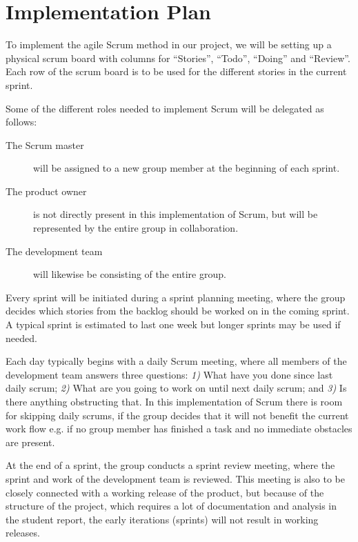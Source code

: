 \chapter{Implementation Plan} %
\label{cha:implementation_plan}
To implement the agile Scrum method in our project, we will be setting up a physical scrum board with columns for “Stories”, “Todo”, “Doing” and “Review”. Each row of the scrum board is to be used for the different stories in the current sprint. 

Some of the different roles needed to implement Scrum will be delegated as follows:
\begin{description}
    \item[The Scrum master] will be assigned to a new group member at the beginning of each sprint.
    \item[The product owner] is not directly present in this implementation of Scrum, but will be represented by the entire group in collaboration.
    \item[The development team] will likewise be consisting of the entire group.
\end{description}

Every sprint will be initiated during a sprint planning meeting, where the group decides which stories from the backlog should be worked on in the coming sprint. 
A typical sprint is estimated to last one week but longer sprints may be used if needed. 

Each day typically begins with a daily Scrum meeting, where all members of the development team answers three questions: \emph{1)} What have you done since last daily scrum; \emph{2)} What are you going to work on until next daily scrum; and \emph{3)} Is there anything obstructing that. 
In this implementation of Scrum there is room for skipping daily scrums, if the group decides that it will not benefit the current work flow e.g. if no group member has finished a task and no immediate obstacles are present. 

At the end of a sprint, the group conducts a sprint review meeting, where the sprint and work of the development team is reviewed. 
This meeting is also to be closely connected with a working release of the product, but because of the structure of the project, which requires a lot of documentation and analysis in the student report, the early iterations (sprints) will not result in working releases.


